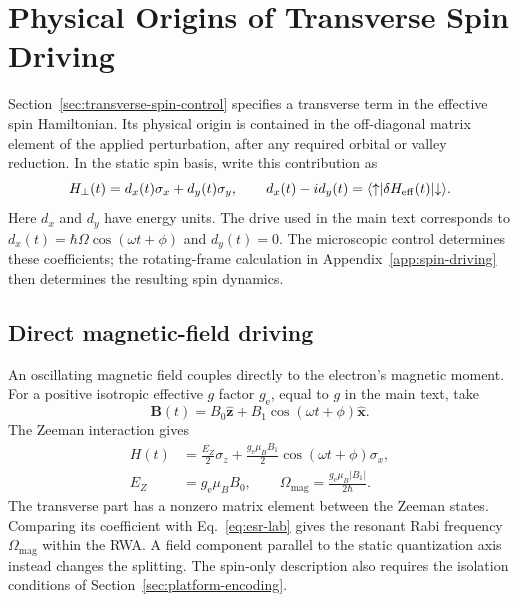 \FloatBarrier
\section{Physical Origins of Transverse Spin Driving}
\label{app:transverse-drive-origins}
\label{app:electric-spin-driving}

Section~\ref{sec:transverse-spin-control} specifies a transverse
term in the effective spin Hamiltonian. Its physical origin is
contained in the off-diagonal matrix element of the applied
perturbation, after any required orbital or valley reduction.
In the static spin basis, write this contribution as
\begin{equation}
 H_\perp(t)=d_x(t)\sigma_x+d_y(t)\sigma_y,\qquad
 d_x(t)-i d_y(t)
 =\bra{\uparrow}\delta H_{\mathrm{eff}}(t)\ket{\downarrow}.
 \label{eq:transverse-drive-matrix-element}
\end{equation}
Here $d_x$ and $d_y$ have energy units. The drive used in the
main text corresponds to $d_x(t)=\hbar\Omega\cos(\omega t+\phi)$ and
$d_y(t)=0$. The microscopic control determines these coefficients;
the rotating-frame calculation in Appendix~\ref{app:spin-driving}
then determines the resulting spin dynamics.

\subsection{Direct magnetic-field driving}
\label{sec:drive-direct-magnetic}

An oscillating magnetic field couples directly to the electron's
magnetic moment. For a positive isotropic effective $g$ factor
$g_{\mathrm e}$, equal to $g$ in the main text, take
\[
 \mathbf B(t)=B_0\hat{\mathbf z}
       +B_1\cos(\omega t+\phi)\hat{\mathbf x}.
\]
The Zeeman interaction gives
\begin{equation}
 \begin{aligned}
 H(t)&=\frac{E_Z}{2}\sigma_z
       +\frac{g_{\mathrm e}\mu_B B_1}{2}
          \cos(\omega t+\phi)\sigma_x,\\
 E_Z&=g_{\mathrm e}\mu_B B_0,\qquad
 \Omega_{\mathrm{mag}}=\frac{g_{\mathrm e}\mu_B|B_1|}{2\hbar}.
 \end{aligned}
 \label{eq:direct-magnetic-spin-drive}
\end{equation}
The transverse part has a nonzero matrix element between the
Zeeman states. Comparing its coefficient with
Eq.~\eqref{eq:esr-lab} gives the resonant Rabi frequency
$\Omega_{\mathrm{mag}}$ within the RWA. A field component parallel
to the static quantization axis instead changes the splitting.
The spin-only description also requires the isolation conditions
of Section~\ref{sec:platform-encoding}.

